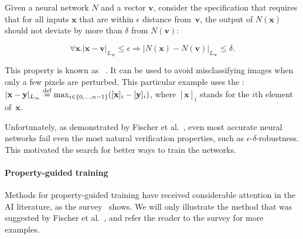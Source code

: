 \documentclass[a4paper,UKenglish,cleveref, autoref, thm-restate]{lipics-v2021}
\newcommand{\vect}[1]{\mathbf{#1}}
\newcommand{\x}{\vect{x}} %
\newcommand{\ve}{\vect{v}} %
\newcommand{\y}{\vect{y}} %
\begin{document}
\begin{example}\label{ex:prop}
Given a neural network $N$ and a vector $\ve$, consider the
specification that requires that for all inputs $\x$ that are within
$\epsilon$ distance from~$\ve$, the output of $N(\x)$ should not
deviate by more than $\delta$ from $N(\ve)$:
 
 $$\forall \x. | \x - \ve|_{L_{\infty}} \leq \epsilon \Rightarrow | N(\x) - 
 N(\ve)|_{L_{\infty}} \leq \delta.$$ 
 
\noindent This  property is known as
~\cite{CasadioKDKKAR22}.
It can be used to avoid misclassifying images when only a few pixels are perturbed. 
This particular example uses the :
$| \x - \y|_{L_{\infty}} \mydef \max_{i\in\{0,\ldots,n-1\}} ([\x]_i - [\y]_i)$,
where $[\x]_i$ stands for the $i$th element of~$\x$.

\end{example}

Unfortunately, as demonstrated by Fischer et al.~\cite{fischer2019dl2}, even most accurate neural networks 
fail even the most natural verification properties, such as $\epsilon$-$\delta$-robustness. This motivated 
the search for better ways to train the networks.  

\paragraph*{Property-guided training} Methods for property-guided
training have received considerable attention in the AI literature, as the 
survey~\cite{ijcai2022p767} shows.
We will only illustrate the method that was suggested by Fischer et
al.~\cite{fischer2019dl2}, and refer the reader to the survey for more
examples.
\end{document}
